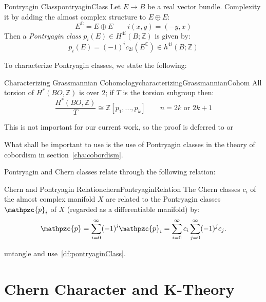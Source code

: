 \documentclass{book}
\newenvironment{Proof}[1][]
  {\begin{ProofTcb}[#1]}
  {\end{ProofTcb}}
\newcommand{\Z}{{\mathbb{Z}}}
\newcommand{\C}{{\mathbb{C}}}
\newcommand{\cp}{{\mathpzc{p}}}
\begin{document}
\begin{defn}{Pontryagin Class}{pontryaginClass}
  Let $E \to B$ be a real vector bundle. Complexity it by adding the almost complex structure to $E\oplus E$:
  \[
    E^\C = E\oplus E \qquad i(x,y) = (-y,x)
  \]
  Then a \emph{Pontryagin class} $p_i(E) \in H^{4i}(B; \Z)$ is given by:
  \[
    p_i(E) = (-1)^ic_{2i}(E^\C) \in h^{4i}(B;\Z)
  \]
\end{defn}

To characterize Pontryagin classes, we state the following:

\begin{prop}{Characterizing Grassmannian Cohomology}{characterizingGrassmannianCohom}
    All torsion of $H^*(BO, \Z)$ is over $2$; if $T$ is the torsion subgroup then:
      \[
        \frac{H^*(BO, \Z)}{T} \cong \Z[p_1, ..., p_k] \qquad n = 2k\text{ or } 2k+1
      \]
\end{prop}

\begin{Proof}
  This is not important for our current work, so the proof is deferred to \cite{NateKTheory} or~\cite{hatcherVectorBundlesKTheory2017}
\end{Proof}

What shall be important to use is the use of Pontryagin classes in the theory of cobordism in
section~\ref{cha:cobordism}.

Pontryagin and Chern classes relate through the following relation:

\begin{thm}{Chern and Pontryagin Relation}{chernPontryaginRelation}
  The Chern classes $c_i$ of the almost complex manifold $X$ are related to the Pontryagin
  classes $\cp_i$ of $X$ (regarded as a differentiable manifold) by:
\[
    \cp = \sum_{i=0}^{\infty} (-1)^i \cp_i = \sum_{i=0}^{\infty} c_i \sum_{j=0}^{\infty} (-1)^j c_j.
\]
\end{thm}

\begin{Proof}
  untangle and use~\cref{df:pontryaginClass}.
\end{Proof}



\section{Chern Character and K-Theory}\label{sec:chernCharacter}
\end{document}
